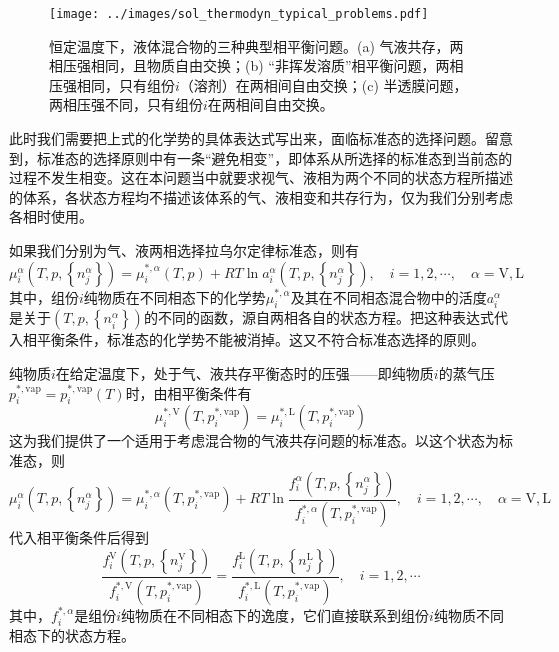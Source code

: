 \documentclass[main.tex]{subfiles}
\begin{document}
\begin{figure}[ht]
    \centering
    \texttt{[image: ../images/sol\_thermodyn\_typical\_problems.pdf]}
    \caption{恒定温度下，液体混合物的三种典型相平衡问题。(a) 气液共存，两相压强相同，且物质自由交换；(b) “非挥发溶质”相平衡问题，两相压强相同，只有组份$i$（溶剂）在两相间自由交换；(c) 半透膜问题，两相压强不同，只有组份$i$在两相间自由交换。}
    \label{fig:sol_thermodyn_typical_problems}
\end{figure}

此时我们需要把上式的化学势的具体表达式写出来，面临标准态的选择问题。留意到，标准态的选择原则中有一条“避免相变”，即体系从所选择的标准态到当前态的过程不发生相变。这在本问题当中就要求视气、液相为两个不同的状态方程所描述的体系，各状态方程均不描述该体系的气、液相变和共存行为，仅为我们分别考虑各相时使用。

如果我们分别为气、液两相选择拉乌尔定律标准态，则有
\begin{equation*}
    \mu_i^\alpha\left(T,p,\left\{n_j^\alpha\right\}\right)=\mu_i^{*,\alpha}\left(T,p\right)+RT\ln a_i^\alpha\left(T,p,\left\{n_j^\alpha\right\}\right),\quad i=1,2,\cdots,\quad \alpha=\text{V},\text{L}
\end{equation*}
其中，组份$i$纯物质在不同相态下的化学势$\mu_i^{*,\alpha}$及其在不同相态混合物中的活度$a_i^\alpha$是关于$\left(T,p,\left\{n_i^\alpha\right\}\right)$的不同的函数，源自两相各自的状态方程。把这种表达式代入相平衡条件，标准态的化学势不能被消掉。这又不符合标准态选择的原则。

纯物质$i$在给定温度下，处于气、液共存平衡态时的压强——即纯物质$i$的蒸气压$p_i^{*,\text{vap}}=p_i^{*,\text{vap}}\left(T\right)$时，由相平衡条件有
\[\mu_i^{*,\text{V}}\left(T,p_i^{*,\text{vap}}\right)=\mu_i^{*,\text{L}}\left(T,p_i^{*,\text{vap}}\right)\]
这为我们提供了一个适用于考虑混合物的气液共存问题的标准态。以这个状态为标准态，则
\begin{equation*}
    \mu_i^\alpha\left(T,p,\left\{n_j^\alpha\right\}\right)=\mu_i^{*,\alpha}\left(T,p_i^{*,\text{vap}}\right)+RT\ln\frac{f_i^\alpha\left(T,p,\left\{n_j^\alpha\right\}\right)}{f_i^{*,\alpha}\left(T,p_i^{*,\text{vap}}\right)},\quad i=1,2,\cdots,\quad\alpha=\text{V},\text{L}
\end{equation*}
代入相平衡条件后得到
\[\frac{f_i^\text{V}\left(T,p,\left\{n_j^\text{V}\right\}\right)}{f_i^{*,\text{V}}\left(T,p_i^{*,\text{vap}}\right)}=\frac{f_i^\text{L}\left(T,p,\left\{n_j^\text{L}\right\}\right)}{f_i^{*,\text{L}}\left(T,p_i^{*,\text{vap}}\right)},\quad i=1,2,\cdots\]
其中，$f_i^{*,\alpha}$是组份$i$纯物质在不同相态下的逸度，它们直接联系到组份$i$纯物质不同相态下的状态方程。
\end{document}
